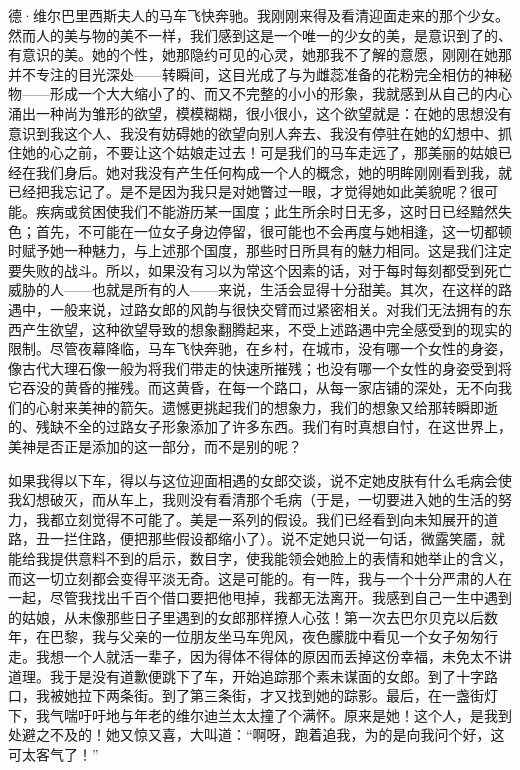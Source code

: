 \par 德·维尔巴里西斯夫人的马车飞快奔驰。我刚刚来得及看清迎面走来的那个少女。然而人的美与物的美不一样，我们感到这是一个唯一的少女的美，是意识到了的、有意识的美。她的个性，她那隐约可见的心灵，她那我不了解的意愿，刚刚在她那并不专注的目光深处——转瞬间，这目光成了与为雌蕊准备的花粉完全相仿的神秘物——形成一个大大缩小了的、而又不完整的小小的形象，我就感到从自己的内心涌出一种尚为雏形的欲望，模模糊糊，很小很小，这个欲望就是：在她的思想没有意识到我这个人、我没有妨碍她的欲望向别人奔去、我没有停驻在她的幻想中、抓住她的心之前，不要让这个姑娘走过去！可是我们的马车走远了，那美丽的姑娘已经在我们身后。她对我没有产生任何构成一个人的概念，她的明眸刚刚看到我，就已经把我忘记了。是不是因为我只是对她瞥过一眼，才觉得她如此美貌呢？很可能。疾病或贫困使我们不能游历某一国度；此生所余时日无多，这时日已经黯然失色；首先，不可能在一位女子身边停留，很可能也不会再度与她相逢，这一切都顿时赋予她一种魅力，与上述那个国度，那些时日所具有的魅力相同。这是我们注定要失败的战斗。所以，如果没有习以为常这个因素的话，对于每时每刻都受到死亡威胁的人——也就是所有的人——来说，生活会显得十分甜美。其次，在这样的路遇中，一般来说，过路女郎的风韵与很快交臂而过紧密相关。对我们无法拥有的东西产生欲望，这种欲望导致的想象翻腾起来，不受上述路遇中完全感受到的现实的限制。尽管夜幕降临，马车飞快奔驰，在乡村，在城市，没有哪一个女性的身姿，像古代大理石像一般为将我们带走的快速所摧残；也没有哪一个女性的身姿受到将它吞没的黄昏的摧残。而这黄昏，在每一个路口，从每一家店铺的深处，无不向我们的心射来美神的箭矢。遗憾更挑起我们的想象力，我们的想象又给那转瞬即逝的、残缺不全的过路女子形象添加了许多东西。我们有时真想自忖，在这世界上，美神是否正是添加的这一部分，而不是别的呢？
\par 如果我得以下车，得以与这位迎面相遇的女郎交谈，说不定她皮肤有什么毛病会使我幻想破灭，而从车上，我则没有看清那个毛病（于是，一切要进入她的生活的努力，我都立刻觉得不可能了。美是一系列的假设。我们已经看到向未知展开的道路，丑一拦住路，便把那些假设都缩小了）。说不定她只说一句话，微露笑靥，就能给我提供意料不到的启示，数目字，使我能领会她脸上的表情和她举止的含义，而这一切立刻都会变得平淡无奇。这是可能的。有一阵，我与一个十分严肃的人在一起，尽管我找出千百个借口要把他甩掉，我都无法离开。我感到自己一生中遇到的姑娘，从未像那些日子里遇到的女郎那样撩人心弦！第一次去巴尔贝克以后数年，在巴黎，我与父亲的一位朋友坐马车兜风，夜色朦胧中看见一个女子匆匆行走。我想一个人就活一辈子，因为得体不得体的原因而丢掉这份幸福，未免太不讲道理。我于是没有道歉便跳下了车，开始追踪那个素未谋面的女郎。到了十字路口，我被她拉下两条街。到了第三条街，才又找到她的踪影。最后，在一盏街灯下，我气喘吁吁地与年老的维尔迪兰太太撞了个满怀。原来是她！这个人，是我到处避之不及的！她又惊又喜，大叫道：“啊呀，跑着追我，为的是向我问个好，这可太客气了！”
